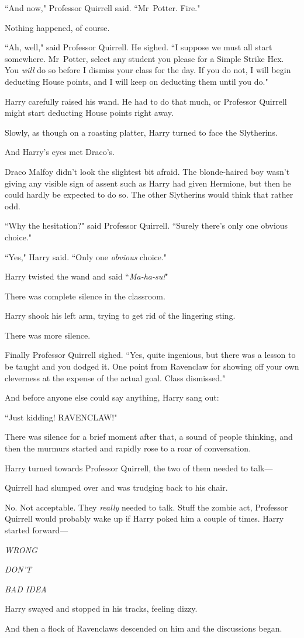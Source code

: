 ``And now," Professor Quirrell said. ``Mr~Potter. Fire."

Nothing happened, of course.

``Ah, well," said Professor Quirrell. He sighed. ``I suppose we must all start somewhere. Mr~Potter, select any student you please for a Simple Strike Hex. You \emph{will} do so before I dismiss your class for the day. If you do not, I will begin deducting House points, and I will keep on deducting them until you do."

Harry carefully raised his wand. He had to do that much, or Professor Quirrell might start deducting House points right away.

Slowly, as though on a roasting platter, Harry turned to face the Slytherins.

And Harry's eyes met Draco's.

Draco Malfoy didn't look the slightest bit afraid. The blonde-haired boy wasn't giving any visible sign of assent such as Harry had given Hermione, but then he could hardly be expected to do so. The other Slytherins would think that rather odd.

``Why the hesitation?" said Professor Quirrell. ``Surely there's only one obvious choice."

``Yes," Harry said. ``Only one \emph{obvious} choice."

Harry twisted the wand and said ``\emph{Ma-ha-su!}"

There was complete silence in the classroom.

Harry shook his left arm, trying to get rid of the lingering sting.

There was more silence.

Finally Professor Quirrell sighed. ``Yes, quite ingenious, but there was a lesson to be taught and you dodged it. One point from Ravenclaw for showing off your own cleverness at the expense of the actual goal. Class dismissed."

And before anyone else could say anything, Harry sang out:

``Just kidding! RAVENCLAW!"

There was silence for a brief moment after that, a sound of people thinking, and then the murmurs started and rapidly rose to a roar of conversation.

Harry turned towards Professor Quirrell, the two of them needed to talk—

Quirrell had slumped over and was trudging back to his chair.

No. Not acceptable. They \emph{really} needed to talk. Stuff the zombie act, Professor Quirrell would probably wake up if Harry poked him a couple of times. Harry started forward—

\emph{WRONG}

\emph{DON'T}

\emph{BAD IDEA}

Harry swayed and stopped in his tracks, feeling dizzy.

And then a flock of Ravenclaws descended on him and the discussions began.

